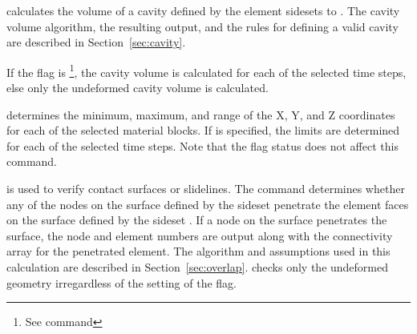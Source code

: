  {
 calculates the volume of a cavity defined by the element
sidesets  to .  The cavity volume
algorithm, the resulting output, and the rules for defining a valid
cavity are described in Section~\ref{sec:cavity}. 

If the  flag is \footnote{See command
}, the cavity volume is calculated for each of the selected
time steps, else only the undeformed cavity volume is calculated. 
}

 {
 determines the minimum, maximum, and range of the 
X, Y, and Z coordinates for each of the selected material blocks.
If  is specified, the limits are determined for each of
the selected time steps.  Note that the  flag status does
not affect this command.
}

 {
 is used to verify contact surfaces or slidelines.  The
command determines whether any of the nodes on the surface defined by
the sideset  penetrate the element faces on the surface
defined by the sideset .  If a node on the
 surface penetrates the  surface, the
node and element numbers are output along with the connectivity array
for the penetrated element. The algorithm and assumptions used in this
calculation are described in Section~\ref{sec:overlap}.  
checks only the undeformed geometry irregardless of the setting of the
 flag. 
}

